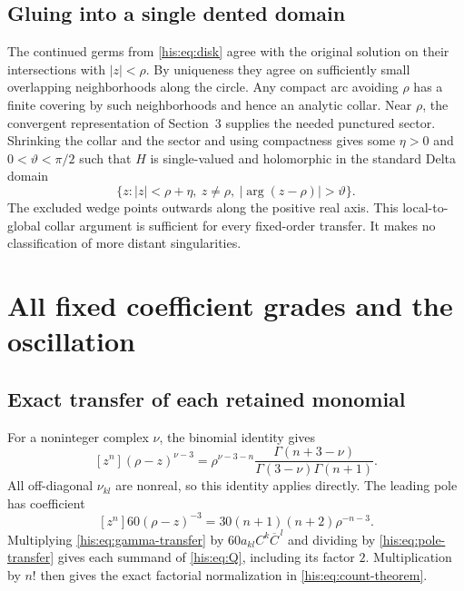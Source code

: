 \documentclass[11pt]{article}
\theoremstyle{remark}\newtheorem{remark}[theorem]{Remark}
\numberwithin{equation}{section}
\begin{document}
\subsection{Gluing into a single dented domain}
The continued germs from \eqref{his:eq:disk} agree with the original solution on their intersections with $|z|<\rho$. By uniqueness they agree on sufficiently small overlapping neighborhoods along the circle. Any compact arc avoiding $\rho$ has a finite covering by such neighborhoods and hence an analytic collar. Near $\rho$, the convergent representation of Section~3 supplies the needed punctured sector. Shrinking the collar and the sector and using compactness gives some $\eta>0$ and $0<\vartheta<\pi/2$ such that $H$ is single-valued and holomorphic in the standard Delta domain
\begin{equation}\label{his:eq:delta}
 \{z:|z|<\rho+\eta,\ z\ne\rho,\ |\arg(z-\rho)|>\vartheta\}.
\end{equation}
The excluded wedge points outwards along the positive real axis. This local-to-global collar argument is sufficient for every fixed-order transfer. It makes no classification of more distant singularities.

\section{All fixed coefficient grades and the oscillation}\label{his:sec:grades}
\subsection{Exact transfer of each retained monomial}
For a noninteger complex $\nu$, the binomial identity gives
\begin{equation}\label{his:eq:gamma-transfer}
 [z^n](\rho-z)^{\nu-3}
 =\rho^{\nu-3-n}\frac{\Gamma(n+3-\nu)}{
                         \Gamma(3-\nu)\Gamma(n+1)}.
\end{equation}
All off-diagonal $\nu_{kl}$ are nonreal, so this identity applies directly. The leading pole has coefficient
\begin{equation}\label{his:eq:pole-transfer}
 [z^n]60(\rho-z)^{-3}
 =30(n+1)(n+2)\rho^{-n-3}.
\end{equation}
Multiplying \eqref{his:eq:gamma-transfer} by $60a_{kl}C^k\overline C^{\,l}$ and dividing by \eqref{his:eq:pole-transfer} gives each summand of \eqref{his:eq:Q}, including its factor $2$. Multiplication by $n!$ then gives the exact factorial normalization in \eqref{his:eq:count-theorem}.
\end{document}
